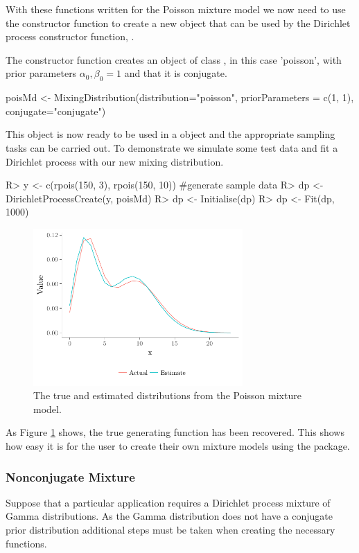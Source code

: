 \documentclass[nojss]{jss}
\begin{document}
With these functions written for the Poisson mixture model we now need to use the  constructor function to create a new object that can be used by the Dirichlet process constructor function, .

The constructor function  creates an object of class , in this case 'poisson', with prior parameters $\alpha_0, \beta_0 = 1$ and that it is conjugate.
\begin{CodeInput}
poisMd <- MixingDistribution(distribution="poisson", priorParameters = c(1, 1), conjugate="conjugate")
\end{CodeInput}
This object is now ready to be used in a  object and the appropriate sampling tasks can be carried out. To demonstrate we simulate some test data and fit a Dirichlet process with our new mixing distribution.

\begin{Schunk}
\begin{Sinput}
R> y <- c(rpois(150, 3), rpois(150, 10)) #generate sample data
R> dp <- DirichletProcessCreate(y, poisMd)
R> dp <- Initialise(dp)
R> dp <- Fit(dp, 1000)
\end{Sinput}
\end{Schunk}

\begin{figure}[tb]
\centering
	\includegraphics[height=60mm, width=80mm]{img/poisson_mixture_plot.pdf}
\caption{The true and estimated distributions from the Poisson mixture model.}
\label{fig:poissonmixture}
\end{figure}
As Figure \ref{fig:poissonmixture} shows, the true generating function has been recovered. This shows how easy it is for the user to create their own mixture models using the  package.


\subsubsection{Nonconjugate Mixture}
Suppose that a particular application requires a Dirichlet process mixture of Gamma distributions. As the Gamma distribution does not have a conjugate prior distribution additional steps must be taken when creating the necessary functions.
\end{document}
